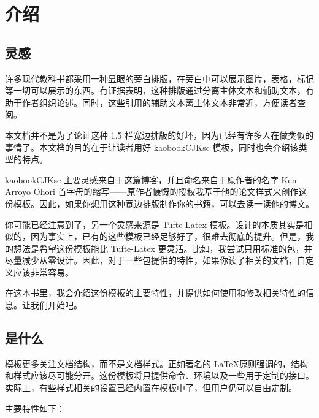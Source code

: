 \setchapterpreamble[u]{\margintoc}
\chapter{介绍}

\section{灵感}

许多现代教科书都采用一种显眼的旁白排版，在旁白中可以展示图片，表格，标记等一切可以展示的东西。有证据表明，这种排版通过分离主体文本和辅助文本，有助于作者组织论述。同时，这些引用的辅助文本离主体文本非常近，方便读者查阅。

本文档并不是为了论证这种 1.5 栏宽边排版的好坏，因为已经有许多人在做类似的事情了。本文档的目的在于让读者用好 kaobookCJKsc 模板，同时也会介绍该类型的特点。

kaobookCJKsc 主要灵感来自于这篇\href{https://3d.bk.tudelft.nl/ken/en/2016/04/17/a-1.5-column-layout-in-latex.html}{博客}，并且命名来自于原作者的名字 Ken Arroyo Ohori 首字母的缩写——原作者慷慨的授权我基于他的论文样式来创作这份模板。因此，如果你想用这种宽边排版制作你的书籍，可以去读一读他的博文。

你可能已经注意到了，另一个灵感来源是 \href{https://github.com/Tufte-LaTeX/tufte-latex}{Tufte-Latex} 模板。设计的本质其实是相似的，因为事实上，已有的这些模板已经足够好了，很难去彻底的提升。但是，我的想法是希望这份模板能比 Tufte-Latex 更灵活。比如，我尝试只用标准的包，并尽量减少从零设计。因此，对于一些包提供的特性，如果你读了相关的文档，自定义应该非常容易。

在这本书里，我会介绍这份模板的主要特性，并提供如何使用和修改相关特性的信息。让我们开始吧。

\section{是什么}

 模板更多关注文档结构，而不是文档样式。正如著名的 \LaTeX 原则强调的，结构和样式应该尽可能分开。这份模板将只提供命令、环境以及一些用于定制的接口。实际上，有些样式相关的设置已经内置在模板中了，但用户仍可以自由定制。

\noindent 主要特性如下：

